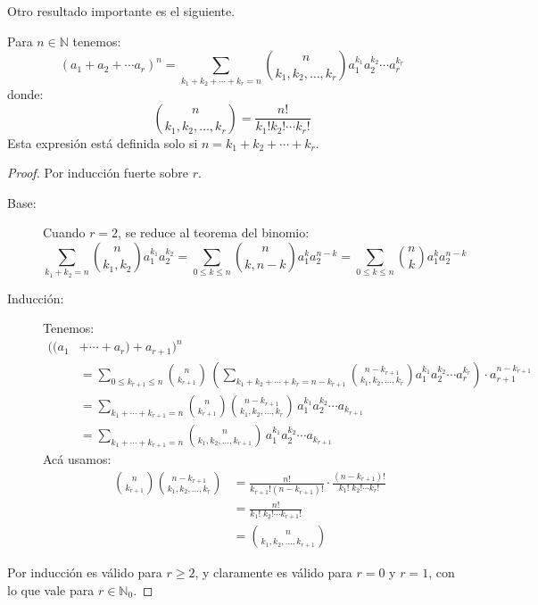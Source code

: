   Otro resultado importante es el siguiente.
  \begin{theorem}[Multinomio]
    \label{theo:multinomio}
    Para \(n \in \mathbb{N}\)
    tenemos:
    \begin{equation*}
      (a_1 +a_2 + \dotsb a_r)^n
	 = \sum_{k_1 + k_2 + \dotsb + k_r = n}
	      \binom{n}{k_1, k_2, \dotsc, k_r}
		  a_1^{k_1} a_2^{k_2} \dotsb a_r^{k_r}
    \end{equation*}
    donde:
    \begin{equation*}
      \binom{n}{k_1, k_2, \dotsc, k_r}
	= \frac{n!}{k_1! k_2! \dotsm k_r!}
    \end{equation*}
    Esta expresión está definida
    solo si \(n = k_1 + k_2 + \dotsb + k_r\).
  \end{theorem}
  \begin{proof}
    Por inducción fuerte sobre \(r\).%
    \begin{description}
    \item[Base:]
      Cuando \(r = 2\),
      se reduce al teorema del binomio:
      \begin{equation*}
	\sum_{k_1 + k_2 = n}
	     \binom{n}{k_1, k_2} a_1^{k_1} a_2^{k_2}
	  = \sum_{0 \le k \le n}
	      \binom{n}{k, n - k} a_1^k a_2^{n - k}
	  = \sum_{0 \le k \le n} \binom{n}{k} a_1^k a_2^{n - k}
      \end{equation*}
    \item[Inducción:]
      Tenemos:
      \begin{align*}
	((a_1 &+ \dotsb + a_r) + a_{r + 1})^n \\
	  &= \sum_{0 \le k_{r + 1} \le n}
	       \binom{n}{k_{r + 1}} \,
		 \left(
		   \sum_{k_1 + k_2 + \dotsb + k_r = n - k_{r + 1}}
		   \binom{n - k_{r + 1}}{k_1, k_2, \dotsc, k_r}
		     a_1^{k_1} a_2^{k_2} \dotsm a_r^{k_r}
		 \right)
	       \cdot a_{r + 1}^{n - k_{r + 1}} \\
	  &= \sum_{k_1 + \dotsb + k_{r + 1} = n}
	       \binom{n}{k_{r + 1}}
		 \binom{n - k_{r + 1}}{k_1, k_2, \dotsc, k_r} \,
		   a_1^{k_1} a_2^{k_2} \dotsm a_{k_{r + 1}} \\
	  &= \sum_{k_1 + \dotsb + k_{r + 1} = n}
	       \binom{n}{k_1, k_2, \dotsc, k_{r + 1}} \,
		 a_1^{k_1} a_2^{k_2} \dotsm a_{k_{r + 1}}
      \end{align*}
      Acá usamos:
      \begin{align*}
	\binom{n}{k_{r + 1}}
	  \binom{n - k_{r + 1}}{k_1, k_2, \dotsc, k_r}
	  &= \frac{n!}{k_{r + 1}! (n - k_{r + 1})!}
	       \cdot \frac{(n - k_{r + 1})!}
			  {k_1! \; k_2! \dotsm k_r!} \\
	  &= \frac{n!}{k_1! \; k_2! \dotsm k_{r + 1}!} \\
	  &= \binom{n}{k_1, k_2, \dotsc, k_{r + 1}}
      \end{align*}
    \end{description}
    Por inducción es válido para \(r \ge 2\),
    y claramente es válido para \(r = 0\) y \(r = 1\),
    con lo que vale para \(r \in \mathbb{N}_0\).
  \end{proof}
